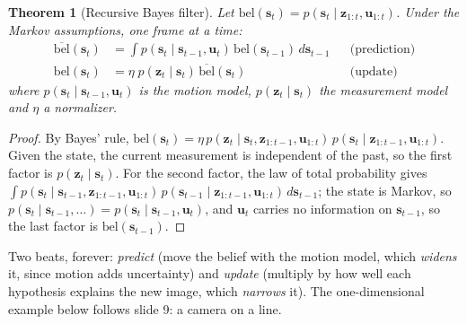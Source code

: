 \documentclass[11pt,a4paper]{article}
\newcommand{\bz}{\bm{z}}
\newcommand{\bu}{\mathbf{u}}
\newcommand{\bs}{\mathbf{s}}
\theoremstyle{definition}
\theoremstyle{plain}
\newtheorem{theorem}[definition]{Theorem}
\theoremstyle{remark}
\begin{document}
\begin{theorem}[Recursive Bayes filter]\label{thm:bayes}
Let $\mathrm{bel}(\bs_t)=p(\bs_t\mid\bz_{1:t},\bu_{1:t})$. Under the Markov assumptions, one frame at a time:
\begin{align*}
\overline{\mathrm{bel}}(\bs_t)&=\int p(\bs_t\mid\bs_{t-1},\bu_t)\,\mathrm{bel}(\bs_{t-1})\,d\bs_{t-1} &&\text{(prediction)}\\
\mathrm{bel}(\bs_t)&=\eta\; p(\bz_t\mid\bs_t)\,\overline{\mathrm{bel}}(\bs_t)&&\text{(update)}
\end{align*}
where $p(\bs_t\mid\bs_{t-1},\bu_t)$ is the \emph{motion model}, $p(\bz_t\mid\bs_t)$ the \emph{measurement model} and $\eta$ a normalizer.
\end{theorem}
\begin{proof}
By Bayes' rule, $\mathrm{bel}(\bs_t)=\eta\,p(\bz_t\mid\bs_t,\bz_{1:t-1},\bu_{1:t})\,p(\bs_t\mid\bz_{1:t-1},\bu_{1:t})$. Given the state, the current measurement is independent of the past, so the first factor is $p(\bz_t\mid\bs_t)$. For the second factor, the law of total probability gives $\int p(\bs_t\mid\bs_{t-1},\bz_{1:t-1},\bu_{1:t})\,p(\bs_{t-1}\mid\bz_{1:t-1},\bu_{1:t})\,d\bs_{t-1}$; the state is Markov, so $p(\bs_t\mid\bs_{t-1},\dots)=p(\bs_t\mid\bs_{t-1},\bu_t)$, and $\bu_t$ carries no information on $\bs_{t-1}$, so the last factor is $\mathrm{bel}(\bs_{t-1})$. \qedhere
\end{proof}
\begin{intuition}
Two beats, forever: \emph{predict} (move the belief with the motion model, which \emph{widens} it, since motion adds uncertainty) and \emph{update} (multiply by how well each hypothesis explains the new image, which \emph{narrows} it). The one-dimensional example below follows slide 9: a camera on a line.
\end{intuition}
\end{document}
